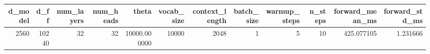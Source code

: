 \begin{tabular}{rrrrrrrrrrrr}
\toprule
d_model & d_ff & num_layers & num_heads & theta & vocab_size & context_length & batch_size & warmup_steps & n_steps & forward_mean_ms & forward_std_ms \\
\midrule
2560 & 10240 & 32 & 32 & 10000.000000 & 10000 & 2048 & 1 & 5 & 10 & 425.077105 & 1.231666 \\
\bottomrule
\end{tabular}
